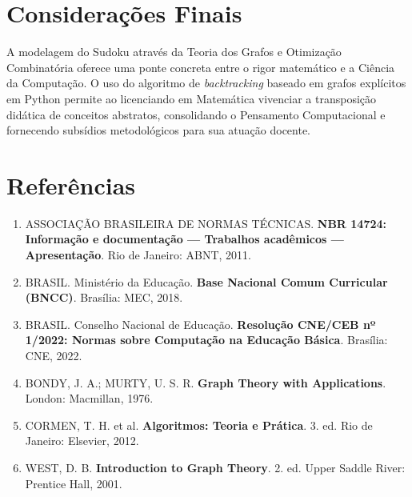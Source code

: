 \documentclass[12pt, a4paper]{article}
\begin{document}
\section{Considerações Finais}
A modelagem do Sudoku através da Teoria dos Grafos e Otimização Combinatória oferece uma ponte concreta entre o rigor matemático e a Ciência da Computação. O uso do algoritmo de \textit{backtracking} baseado em grafos explícitos em Python permite ao licenciando em Matemática vivenciar a transposição didática de conceitos abstratos, consolidando o Pensamento Computacional e fornecendo subsídios metodológicos para sua atuação docente.

\section*{Referências}
\begin{enumerate}
    \item ASSOCIAÇÃO BRASILEIRA DE NORMAS TÉCNICAS. \textbf{NBR 14724: Informação e documentação — Trabalhos acadêmicos — Apresentação}. Rio de Janeiro: ABNT, 2011.
    \item BRASIL. Ministério da Educação. \textbf{Base Nacional Comum Curricular (BNCC)}. Brasília: MEC, 2018.
    \item BRASIL. Conselho Nacional de Educação. \textbf{Resolução CNE/CEB nº 1/2022: Normas sobre Computação na Educação Básica}. Brasília: CNE, 2022.
    \item BONDY, J. A.; MURTY, U. S. R. \textbf{Graph Theory with Applications}. London: Macmillan, 1976.
    \item CORMEN, T. H. et al. \textbf{Algoritmos: Teoria e Prática}. 3. ed. Rio de Janeiro: Elsevier, 2012.
    \item WEST, D. B. \textbf{Introduction to Graph Theory}. 2. ed. Upper Saddle River: Prentice Hall, 2001.
\end{enumerate}
\end{document}
